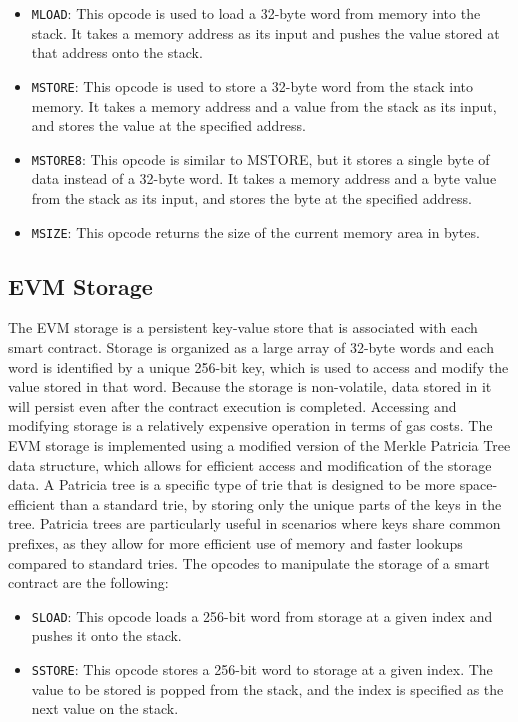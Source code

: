 \begin{itemize}
    \item \texttt{MLOAD}: This opcode is used to load a 32-byte word from memory into the stack. It takes a memory address as its input and pushes the value stored at that address onto the stack.
    \item \texttt{MSTORE}: This opcode is used to store a 32-byte word from the stack into memory. It takes a memory address and a value from the stack as its input, and stores the value at the specified address.
    \item \texttt{MSTORE8}: This opcode is similar to MSTORE, but it stores a single byte of data instead of a 32-byte word. It takes a memory address and a byte value from the stack as its input, and stores the byte at the specified address.
    \item \texttt{MSIZE}: This opcode returns the size of the current memory area in bytes.
\end{itemize}




\subsection{EVM Storage}

The EVM storage is a persistent key-value store that is associated with each smart contract. 
Storage is organized as a large array of 32-byte words and each word is identified by a unique 256-bit key, 
which is used to access and modify the value stored in that word.
Because the storage is non-volatile, data stored in it will persist even after the contract execution is completed. 
Accessing and modifying storage is a relatively expensive operation in terms of gas costs.
The EVM storage is implemented using a modified version of the Merkle Patricia Tree data structure, which allows for efficient access and modification of the storage data. 
A Patricia tree is a specific type of trie that is designed to be more space-efficient than a standard trie, by storing only the unique parts of the keys in the tree.
Patricia trees are particularly useful in scenarios where keys share common prefixes, as they allow for more efficient use of memory and faster lookups compared to standard tries.
The opcodes to manipulate the storage of a smart contract are the following:

\begin{itemize}
    \item \texttt{SLOAD}: This opcode loads a 256-bit word from storage at a given index and pushes it onto the stack.
    \item \texttt{SSTORE}: This opcode stores a 256-bit word to storage at a given index. The value to be stored is popped from the stack, and the index is specified as the next value on the stack.
\end{itemize}


